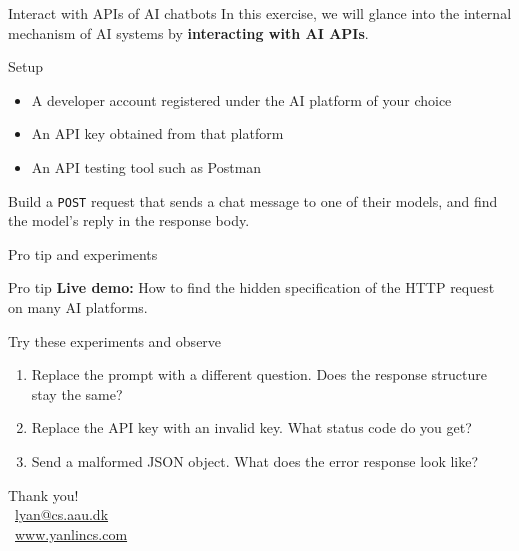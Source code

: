 \documentclass[aspectratio=169]{beamer}
\def\live#1{{\color{aaublue}\textbf{Live demo:}} #1}
\begin{document}
\begin{frame}{Interact with APIs of AI chatbots}
In this exercise, we will glance into the internal mechanism of AI systems by \textbf{interacting with AI APIs}.

    \begin{block}{Setup}
        \begin{itemize}
            \item A developer account registered under the AI platform of your choice
            \item An API key obtained from that platform
            \item An API testing tool such as Postman
        \end{itemize}
    \end{block}

    Build a \texttt{POST} request that sends a chat message to one of their models, and find the model's reply in the response body.
\end{frame}


\begin{frame}{Pro tip and experiments}
    \begin{block}{Pro tip}
      \live{How to find the hidden specification of the HTTP request on many AI platforms.}
    \end{block}

    \begin{block}{Try these experiments and observe}
        \begin{enumerate}
            \item Replace the prompt with a different question. Does the response structure stay the same?
            \item Replace the API key with an invalid key. What status code do you get?
            \item Send a malformed JSON object. What does the error response look like?
        \end{enumerate}
    \end{block}
\end{frame}



\appendix

\begin{frame}
\begin{center}
{\large Thank you!}
\vspace{1cm}
\\[0.5em]
{\small \faEnvelope\ \href{mailto:lyan@cs.aau.dk}{lyan@cs.aau.dk} \\
\faGlobe\ \href{https://www.yanlincs.com}{www.yanlincs.com}}
\end{center}
\note{
}
\end{frame}
\end{document}
